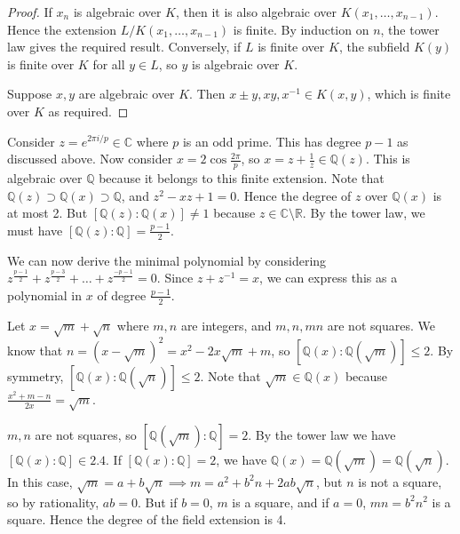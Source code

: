 \begin{proof}
	If \( x_n \) is algebraic over \( K \), then it is also algebraic over \( K(x_1, \dots, x_{n-1}) \).
	Hence the extension \( L / K(x_1, \dots, x_{n-1}) \) is finite.
	By induction on \( n \), the tower law gives the required result.
	Conversely, if \( L \) is finite over \( K \), the subfield \( K(y) \) is finite over \( K \) for all \( y \in L \), so \( y \) is algebraic over \( K \).

	Suppose \( x, y \) are algebraic over \( K \).
	Then \( x \pm y, xy, x^{-1} \in K(x,y) \), which is finite over \( K \) as required.
\end{proof}
\begin{example}
	Consider \( z = e^{2\pi i/p} \in \mathbb C \) where \( p \) is an odd prime.
	This has degree \( p - 1 \) as discussed above.
	Now consider \( x = 2\cos \frac{2\pi}{p} \), so \( x = z + \frac 1z \in \mathbb Q(z) \).
	This is algebraic over \( \mathbb Q \) because it belongs to this finite extension.
	Note that \( \mathbb Q(z) \supset \mathbb Q(x) \supset \mathbb Q \), and \( z^2 - xz + 1 = 0 \).
	Hence the degree of \( z \) over \( \mathbb Q(x) \) is at most 2.
	But \( [\mathbb Q(z):\mathbb Q(x)] \neq 1 \) because \( z \in \mathbb C \setminus \mathbb R \).
	By the tower law, we must have \( [\mathbb Q(z):\mathbb Q] = \frac{p-1}{2} \).

	We can now derive the minimal polynomial by considering \( z^{\frac{p-1}{2}} + z^{\frac{p-3}{2}} + \dots + z^{\frac{-p-1}{2}} = 0 \).
	Since \( z + z^{-1} = x \), we can express this as a polynomial in \( x \) of degree \( \frac{p-1}{2} \).
\end{example}
\begin{example}
	Let \( x = \sqrt m + \sqrt n \) where \( m, n \) are integers, and \( m, n, mn \) are not squares.
	We know that \( n = (x-\sqrt m)^2 = x^2 - 2x\sqrt m + m \), so \( [\mathbb Q(x):\mathbb Q(\sqrt m)] \leq 2 \).
	By symmetry, \( [\mathbb Q(x):\mathbb Q(\sqrt n)] \leq 2 \).
	Note that \( \sqrt m \in \mathbb Q(x) \) because \( \frac{x^2 + m - n}{2x} = \sqrt m \).

	\( m, n \) are not squares, so \( [\mathbb Q(\sqrt m):\mathbb Q] = 2 \).
	By the tower law we have \( [\mathbb Q(x):\mathbb Q] \in \qty{2,4} \).
	If \( [\mathbb Q(x):\mathbb Q] = 2 \), we have \( \mathbb Q(x) = \mathbb Q(\sqrt m) = \mathbb Q(\sqrt n) \).
	In this case, \( \sqrt m = a + b \sqrt n \implies m = a^2 + b^2 n + 2ab \sqrt n \), but \( n \) is not a square, so by rationality, \( ab = 0 \).
	But if \( b = 0 \), \( m \) is a square, and if \( a = 0 \), \( mn = b^2 n^2 \) is a square.
	Hence the degree of the field extension is 4.
\end{example}
